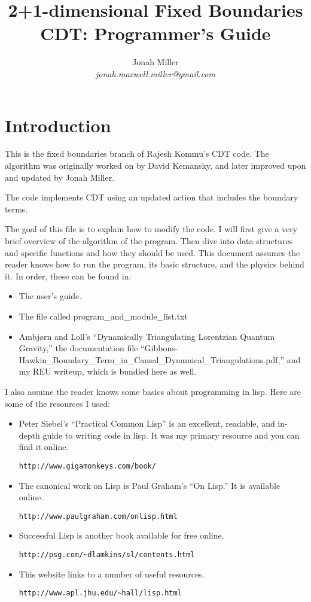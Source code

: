 \documentclass[12pt]{article}
\author{Jonah Miller\\
\textit{jonah.maxwell.miller@gmail.com}}
\title{2+1-dimensional Fixed Boundaries CDT: Programmer's Guide}
\begin{document}
\maketitle

\section{Introduction}
\label{s:intro}

This is the fixed boundaries branch of Rajesh Kommu's CDT code. The
algorithm was originally worked on by David Kemansky, and later
improved upon and updated by Jonah Miller.

The code implements CDT using an updated action that includes the
boundary terms.

The goal of this file is to explain how to modify the code. I will
first give a very brief overview of the algorithm of the program. Then
dive into data structures and specific functions and how they should
be used. This document assumes the reader knows how to run the
program, its basic structure, and the physics behind it. In order,
these can be found in:
\begin{itemize}
\item The user's guide.
\item The file called program\_and\_module\_list.txt
\item Ambj\o rn and Loll's ``Dynamically Triangulating Lorentzian
  Quantum Gravity,'' the documentation file
  ``Gibbons-Hawkin\_Boundary\_Term\_in\_Causal\_Dynamical\_Triangulations.pdf,''
  and my REU writeup, which is bundled here as well.
\end{itemize}

I also assume the reader knows some basics about programming in
lisp. Here are some of the resources I used:
\begin{itemize}
\item Peter Siebel's ``Practical Common Lisp'' is an excellent,
  readable, and in-depth guide to writing code in lisp. It was my
  primary resource and you can find it online.
  \begin{verbatim}
http://www.gigamonkeys.com/book/
\end{verbatim}
\item The canonical work on Lisp is Paul Graham's ``On Lisp.'' It is available online.
\begin{verbatim}
http://www.paulgraham.com/onlisp.html
\end{verbatim}
\item Successful Lisp is another book available for free online.
\begin{verbatim}
http://psg.com/~dlamkins/sl/contents.html
\end{verbatim}
\item This website links to a number of useful resources.
  \begin{verbatim}
http://www.apl.jhu.edu/~hall/lisp.html
\end{verbatim}
\end{itemize}
\end{document}
